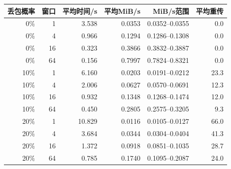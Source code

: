\begin{tabular}{rrrrrr}\toprule
丢包概率 & 窗口 & 平均时间/s & 平均MiB/s & MiB/s范围 & 平均重传 \\ \midrule
0\% & 1 & 3.538 & 0.0353 & 0.0352--0.0355 & 0.0 \\
0\% & 4 & 0.966 & 0.1294 & 0.1286--0.1308 & 0.0 \\
0\% & 16 & 0.323 & 0.3866 & 0.3832--0.3887 & 0.0 \\
0\% & 64 & 0.156 & 0.7997 & 0.7824--0.8321 & 0.0 \\
10\% & 1 & 6.160 & 0.0203 & 0.0191--0.0212 & 23.3 \\
10\% & 4 & 2.006 & 0.0627 & 0.0570--0.0691 & 12.3 \\
10\% & 16 & 0.932 & 0.1348 & 0.1268--0.1474 & 12.0 \\
10\% & 64 & 0.450 & 0.2805 & 0.2575--0.3205 & 9.3 \\
20\% & 1 & 10.829 & 0.0116 & 0.0105--0.0127 & 66.0 \\
20\% & 4 & 3.684 & 0.0344 & 0.0304--0.0404 & 41.3 \\
20\% & 16 & 1.372 & 0.0918 & 0.0851--0.1035 & 28.7 \\
20\% & 64 & 0.785 & 0.1740 & 0.1095--0.2087 & 24.0 \\
\bottomrule\end{tabular}
